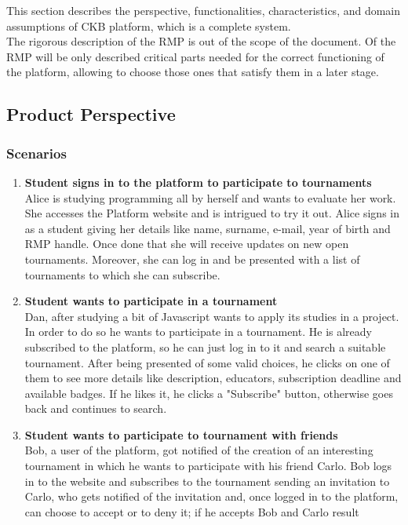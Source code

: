 This section describes the perspective, functionalities, characteristics, and domain assumptions of CKB platform, which is a complete system.\\
The rigorous description of the RMP is out of the scope of the document. Of the RMP will be only described critical parts needed for the correct functioning of the platform, allowing to choose those ones that satisfy them in a later stage.
\\
\subsection{Product Perspective}
\subsubsection{Scenarios}
\begin{enumerate}[label= \textbf{SC\arabic*}]
    \item \textbf{Student signs in to the platform to participate to tournaments}
    \label{sc:sc1}\\ Alice is studying programming all by herself and wants to evaluate her work. She accesses the Platform website and is intrigued to try it out. 
    Alice signs in as a student giving her details like name, surname, e-mail,  year of birth and RMP handle. Once done that she will receive updates on new open tournaments. Moreover, she can log in and be presented with a list 
    of tournaments to which she can subscribe.
    \item \textbf{Student wants to participate in a tournament} \label{sc:sc2}\\ Dan, after studying a bit of Javascript wants to apply its studies in a project. In order to do so he wants to participate in a tournament. He is already subscribed 
    to the platform, so he can just log in to it and search a suitable tournament. After being presented of some valid choices, he clicks on one of them to see more details like description, educators, subscription deadline and 
    available badges. If he likes it, he clicks a "Subscribe" button, otherwise goes back and continues to search.
    \item \textbf{Student wants to participate to tournament with friends} \label{sc:sc3}\\ Bob, a user of the platform, got notified of the creation of an interesting tournament in which he wants to participate with his friend Carlo. Bob logs in 
    to the website and subscribes to the tournament sending an invitation to Carlo, who gets notified of the invitation and, once logged in to the platform, can choose to accept or to deny it; if he accepts Bob and Carlo result 

\end{enumerate}
